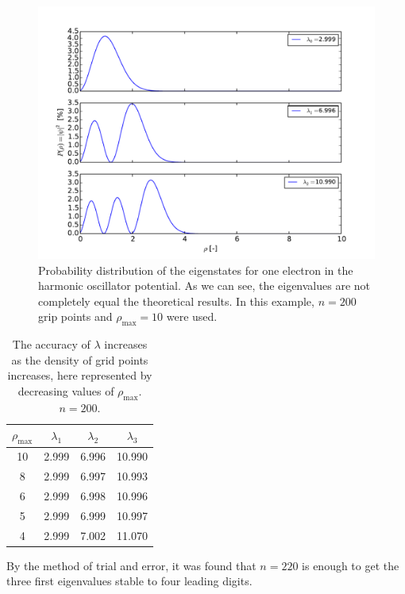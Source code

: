 \documentclass[11pt, a4paper]{article}
\begin{document}
			\begin{figure}
				\centering
				\includegraphics[scale=0.7, clip=true, trim= 0 0 0 0]{plot-oneElectron}
				\caption{Probability distribution of the eigenstates for one electron in the harmonic oscillator potential. As we can see, the eigenvalues are not completely equal the theoretical results. In this example, $n=200$ grip points and $\rho_\mathrm{max}=10$ were used.} 
				\label{fig: one electron P-distribution}
			\end{figure}
			\begin{table}
				\centering
				\caption{The accuracy of $\lambda$ increases as the density of grid points increases, here represented by decreasing values of $\rho_\mathrm{max}$. $n=200$.}
				\label{table: eigenvalues and rho_max}
				\begin{tabular}{|c|c|c|c|}
					\hline
					$\rho_\mathrm{max}$		&	$\lambda_1$	&	$\lambda_2$	&	$\lambda_3$	\\
					\hline
					10										&	2.999				&	6.996				&	10.990				\\
					8										&	2.999				&	6.997				&	10.993				\\
					6										&	2.999				&	6.998				&	10.996				\\
					5										&	2.999				&	6.999				&	10.997				\\
					4										&	2.999				&	7.002				&	11.070				\\
					\hline
				\end{tabular}
			\end{table}
			
			By the method of trial and error, it was found that $n=220$ is enough to get the three first eigenvalues stable to four leading digits.
			
\end{document}
